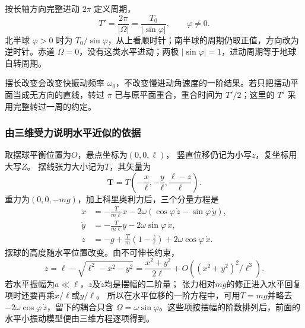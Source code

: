 \documentclass[UTF8,fontset=fandol,a4paper,11pt]{ctexart}
\newcommand{\vect}[1]{\bm{#1}}
\begin{document}
按长轴方向完整进动 $2\pi$ 定义周期，
\[
\boxed{T'=\frac{2\pi}{|\Omega|}=\frac{T_0}{|\sin\varphi|}},
\qquad\varphi\ne0.
\]
北半球 $\varphi>0$ 时为 $T_0/\sin\varphi$，从上看顺时针；南半球的周期仍取正值，方向改为逆时针。赤道 $\Omega=0$，没有这类水平进动；两极 $|\sin\varphi|=1$，进动周期等于地球自转周期。

摆长改变会改变快振动频率 $\omega_0$，不改变慢进动角速度的一阶结果。若只把摆动平面当成无方向的直线，转过 $\pi$ 已与原平面重合，重合时间为 $T'/2$；这里的 $T'$ 采用完整转过一周的约定。
\subsubsection*{由三维受力说明水平近似的依据}
取摆球平衡位置为$O$，悬点坐标为$(0,0,\ell)$，
竖直位移仍记为小写$z$，复坐标用大写$Z$。
摆线张力大小记为$T$，其矢量为
\[
\vect T=T\left(-\frac x\ell,-\frac y\ell,\frac{\ell-z}{\ell}\right).
\]
重力为$(0,0,-mg)$，加上科里奥利力后，三个分量方程是
\[
\begin{aligned}
\ddot x&=-\frac{T}{m\ell}x
-2\omega(\cos\varphi\,\dot z-\sin\varphi\,\dot y),\\
\ddot y&=-\frac{T}{m\ell}y-2\omega\sin\varphi\,\dot x,\\
\ddot z&=-g+\frac Tm\left(1-\frac z\ell\right)
+2\omega\cos\varphi\,\dot x.
\end{aligned}
\]
摆球的高度随水平位置改变。由不可伸长约束，
\[
z=\ell-\sqrt{\ell^2-x^2-y^2}
=\frac{x^2+y^2}{2\ell}+O((x^2+y^2)^2/\ell^3).
\]
若水平振幅为$a\ll\ell$，$z$及$\dot z$均是摆幅的二阶量；
张力相对$mg$的修正进入水平回复项时还要再乘$x/\ell$或$y/\ell$。
所以在水平位移的一阶方程中，可用$T=mg$并略去
$-2\omega\cos\varphi\,\dot z$，留下的耦合只含
$\Omega=\omega\sin\varphi$。这些项按摆幅的阶数排列后，前面的水平小振动模型便由三维方程逐项得到。
\end{document}
